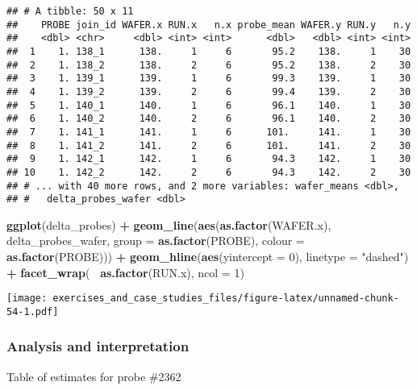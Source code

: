 \documentclass[]{book}
\newenvironment{Shaded}{\begin{snugshade}}{\end{snugshade}}
\newcommand{\DataTypeTok}[1]{\textcolor[rgb]{0.13,0.29,0.53}{#1}}
\newcommand{\DecValTok}[1]{\textcolor[rgb]{0.00,0.00,0.81}{#1}}
\newcommand{\KeywordTok}[1]{\textcolor[rgb]{0.13,0.29,0.53}{\textbf{#1}}}
\newcommand{\NormalTok}[1]{#1}
\newcommand{\OperatorTok}[1]{\textcolor[rgb]{0.81,0.36,0.00}{\textbf{#1}}}
\newcommand{\StringTok}[1]{\textcolor[rgb]{0.31,0.60,0.02}{#1}}
\theoremstyle{definition}
\theoremstyle{definition}
\theoremstyle{definition}
\theoremstyle{remark}
\begin{document}
\begin{verbatim}
## # A tibble: 50 x 11
##    PROBE join_id WAFER.x RUN.x   n.x probe_mean WAFER.y RUN.y   n.y
##    <dbl> <chr>     <dbl> <int> <int>      <dbl>   <dbl> <int> <int>
##  1    1. 138_1      138.     1     6       95.2    138.     1    30
##  2    1. 138_2      138.     2     6       95.2    138.     2    30
##  3    1. 139_1      139.     1     6       99.3    139.     1    30
##  4    1. 139_2      139.     2     6       99.4    139.     2    30
##  5    1. 140_1      140.     1     6       96.1    140.     1    30
##  6    1. 140_2      140.     2     6       96.1    140.     2    30
##  7    1. 141_1      141.     1     6      101.     141.     1    30
##  8    1. 141_2      141.     2     6      101.     141.     2    30
##  9    1. 142_1      142.     1     6       94.3    142.     1    30
## 10    1. 142_2      142.     2     6       94.3    142.     2    30
## # ... with 40 more rows, and 2 more variables: wafer_means <dbl>,
## #   delta_probes_wafer <dbl>
\end{verbatim}

\begin{Shaded}
\begin{Highlighting}[]
\KeywordTok{ggplot}\NormalTok{(delta_probes) }\OperatorTok{+}
\StringTok{  }\KeywordTok{geom_line}\NormalTok{(}\KeywordTok{aes}\NormalTok{(}\KeywordTok{as.factor}\NormalTok{(WAFER.x), delta_probes_wafer, }\DataTypeTok{group =} \KeywordTok{as.factor}\NormalTok{(PROBE), }\DataTypeTok{colour =} \KeywordTok{as.factor}\NormalTok{(PROBE))) }\OperatorTok{+}
\StringTok{  }\KeywordTok{geom_hline}\NormalTok{(}\KeywordTok{aes}\NormalTok{(}\DataTypeTok{yintercept =} \DecValTok{0}\NormalTok{), }\DataTypeTok{linetype =} \StringTok{"dashed"}\NormalTok{) }\OperatorTok{+}
\StringTok{  }\KeywordTok{facet_wrap}\NormalTok{(}\OperatorTok{~}\StringTok{ }\KeywordTok{as.factor}\NormalTok{(RUN.x), }\DataTypeTok{ncol =} \DecValTok{1}\NormalTok{) }
\end{Highlighting}
\end{Shaded}

\texttt{[image: exercises\_and\_case\_studies\_files/figure-latex/unnamed-chunk-54-1.pdf]}

\hypertarget{analysis-and-interpretation}{%
\subsubsection{Analysis and
interpretation}\label{analysis-and-interpretation}}

Table of estimates for probe \#2362
\end{document}
